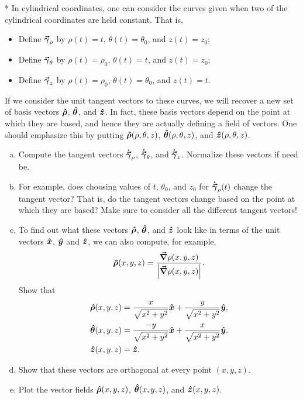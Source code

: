 \documentclass[12pt]{article} %
\begin{document}
\vspace*{1cm}
\begin{problem}
* In cylindrical coordinates, one can consider the curves given when two of the cylindrical coordinates are held constant.  That is, 
\begin{itemize}
    \item Define $\boldsymbol{\vec{\gamma}}_\rho$ by $\rho(t)=t$, $\theta(t)=\theta_0$, and $z(t)=z_0$;
    \item Define $\boldsymbol{\vec{\gamma}}_\theta$ by $\rho(t)=\rho_0$, $\theta(t)=t$, and $z(t)=z_0$;
    \item Define $\boldsymbol{\vec{\gamma}}_z$ by $\rho(t)=\rho_0$, $\theta(t)=\theta_0$, and $z(t)=t$.
\end{itemize}
If we consider the unit tangent vectors to these curves, we will recover a new set of basis vectors $\boldsymbol{\boldsymbol{\hat{\rho}}}$, $\boldsymbol{\boldsymbol{\hat{\theta}}}$, and $\boldsymbol{\hat{z}}$.  In fact, these basis vectors depend on the point at which they are based, and hence they are actually defining a field of vectors.  One should emphasize this by putting $\boldsymbol{\boldsymbol{\hat{\rho}}}(\rho,\theta,z)$, $\boldsymbol{\boldsymbol{\hat{\theta}}}(\rho,\theta,z)$, and $\boldsymbol{\hat{z}}(\rho,\theta,z)$.
\begin{enumerate}[(a)]
    \item Compute the tangent vectors $\boldsymbol{\dot{\vec{\gamma}}}_\rho$, $\boldsymbol{\dot{\vec{\gamma}}}_\theta$, and $\boldsymbol{\dot{\vec{\gamma}}}_z$.  Normalize these vectors if need be.
    \item For example, does choosing values of $t$, $\theta_0$, and $z_0$ for $\boldsymbol{\dot{\vec{\gamma}}}_\rho(t)$ change the tangent vector? That is, do the tangent vectors change based on the point at which they are based? Make sure to consider all the different tangent vectors!
    \item To find out what these vectors $\boldsymbol{\boldsymbol{\hat{\rho}}}$, $\boldsymbol{\boldsymbol{\hat{\theta}}}$, and $\boldsymbol{\hat{z}}$ look like in terms of the unit vectors $\boldsymbol{\hat{x}}$, $\boldsymbol{\hat{y}}$ and $\boldsymbol{\hat{z}}$, we can also compute, for example,
    \[
    \boldsymbol{\boldsymbol{\hat{\rho}}}(x,y,z) = \frac{\boldsymbol{\vec{\nabla}} \rho(x,y,z)}{\left| \boldsymbol{\vec{\nabla}} \rho(x,y,z) \right|}.
    \]
    Show that
    \begin{align*}
        \boldsymbol{\boldsymbol{\hat{\rho}}}(x,y,z) &= \frac{x}{\sqrt{x^2+y^2}}\boldsymbol{\hat{x}} + \frac{y}{\sqrt{x^2+y^2}} \boldsymbol{\hat{y}},\\
        \boldsymbol{\boldsymbol{\hat{\theta}}}(x,y,z) &= \frac{-y}{\sqrt{x^2+y^2}} \boldsymbol{\hat{x}} + \frac{x}{\sqrt{x^2+y^2}} \boldsymbol{\hat{y}},\\
        \boldsymbol{\hat{z}}(x,y,z) &= \boldsymbol{\hat{z}}.
    \end{align*}
    \item Show that these vectors are orthogonal at every point $(x,y,z)$.
    \item Plot the vector fields $\boldsymbol{\boldsymbol{\hat{\rho}}}(x,y,z)$, $\boldsymbol{\boldsymbol{\hat{\theta}}}(x,y,z)$, and $\boldsymbol{\hat{z}}(x,y,z)$.
\end{enumerate}
\end{problem}
\end{document}
